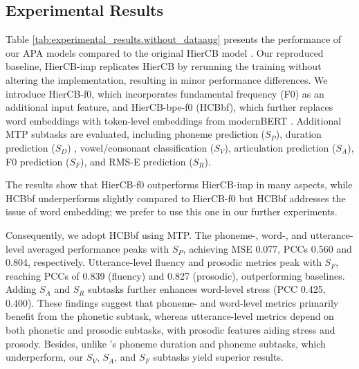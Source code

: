 \documentclass[conference,a4paper]{APSIPA2025}
\begin{document}
\subsection{Experimental Results}
\label{subsec:experimental_results}

Table \ref{tab:experimental_results.without_dataaug} presents the performance of our APA models compared to the original HierCB model \cite{10890778}. Our reproduced baseline, HierCB-imp replicates HierCB by rerunning the training without altering the implementation, resulting in minor performance differences. We introduce HierCB-f0, which incorporates fundamental frequency (F0) as an additional input feature, and HierCB-bpe-f0 (HCBbf), which further replaces word embeddings with token-level embeddings from modernBERT \cite{warner2024smarterbetterfasterlonger}. Additional MTP subtasks are evaluated, including phoneme prediction ($S_{P}$), duration prediction ($S_{D}$) \cite{fu23_interspeech}, vowel/consonant classification ($S_{V}$), articulation prediction ($S_{A}$), F0 prediction ($S_{F}$), and RMS-E prediction ($S_{R}$).

The results show that HierCB-f0 outperforms HierCB-imp in many aspects, while HCBbf underperforms slightly compared to HierCB-f0 but HCBbf addresses the issue of word embedding; we prefer to use this one in our further experiments.

Consequently, we adopt HCBbf using MTP. The phoneme-, word-, and utterance-level averaged performance peaks with $S_P$, achieving MSE 0.077, PCCs 0.560 and 0.804, respectively. Utterance-level fluency and prosodic metrics peak with $S_F$, reaching PCCs of 0.839 (fluency) and 0.827 (prosodic), outperforming baselines. Adding $S_A$ and $S_R$ subtasks further enhances word-level stress (PCC 0.425, 0.400). These findings suggest that phoneme- and word-level metrics primarily benefit from the phonetic subtask, whereas utterance-level metrics depend on both phonetic and prosodic subtasks, with prosodic features aiding stress and prosody. Besides, unlike \cite{fu23_interspeech}’s phoneme duration and phoneme subtasks, which underperform, our $S_{V}$, $S_{A}$, and $S_{F}$ subtasks yield superior results.
\end{document}
